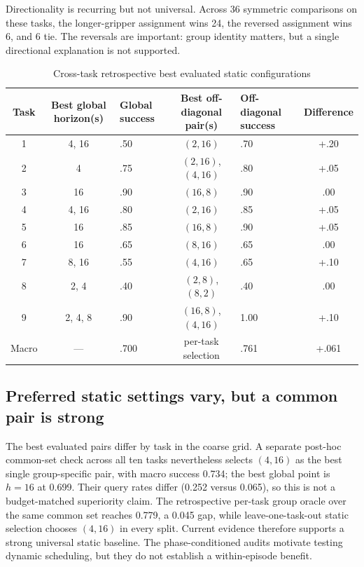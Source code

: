 Directionality is recurring but not universal.  Across 36 symmetric comparisons
on these tasks, the longer-gripper assignment wins 24, the reversed assignment
wins 6, and 6 tie.  The reversals are important: group identity matters, but a
single directional explanation is not supported.

\begin{table}[t]
\caption{Cross-task retrospective best evaluated static configurations}
\label{tab:cross_task}
\centering
\scriptsize
\setlength{\tabcolsep}{5.0pt}
\begin{tabular}{cclclc}
\toprule
Task & Best global horizon(s) & Global success & Best off-diagonal pair(s) & Off-diagonal success & Difference \\
\midrule
1 & 4, 16 & .50 & $(2,16)$ & .70 & +.20 \\
2 & 4 & .75 & $(2,16)$, $(4,16)$ & .80 & +.05 \\
3 & 16 & .90 & $(16,8)$ & .90 & .00 \\
4 & 4, 16 & .80 & $(2,16)$ & .85 & +.05 \\
5 & 16 & .85 & $(16,8)$ & .90 & +.05 \\
6 & 16 & .65 & $(8,16)$ & .65 & .00 \\
7 & 8, 16 & .55 & $(4,16)$ & .65 & +.10 \\
8 & 2, 4 & .40 & $(2,8)$, $(8,2)$ & .40 & .00 \\
9 & 2, 4, 8 & .90 & $(16,8)$, $(4,16)$ & 1.00 & +.10 \\
\midrule
Macro & --- & .700 & per-task selection & .761 & +.061 \\
\bottomrule
\end{tabular}
\end{table}

\subsection{Preferred static settings vary, but a common pair is strong}

The best evaluated pairs differ by task in the coarse grid.  A separate post-hoc
common-set check across all ten tasks nevertheless selects $(4,16)$ as the best
single group-specific pair, with macro success 0.734; the best global point is
$h=16$ at 0.699.  Their query rates differ (0.252 versus 0.065), so this is not a
budget-matched superiority claim.  The retrospective per-task group oracle over
the same common set reaches 0.779, a 0.045 gap, while leave-one-task-out static
selection chooses $(4,16)$ in every split.  Current evidence therefore supports
a strong universal static baseline.  The phase-conditioned audits motivate
testing dynamic scheduling, but they do not establish a within-episode benefit.

